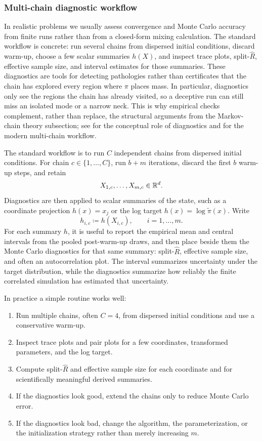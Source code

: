 \subsubsection{Multi-chain diagnostic workflow}
\label{subsec:mcmc-diagnostics}

In realistic problems we usually assess convergence and Monte Carlo accuracy from finite runs rather than from a closed-form mixing calculation.
The standard workflow is concrete: run several chains from dispersed initial conditions, discard warm-up, choose a few scalar summaries \(h(X)\), and inspect trace plots, split-\(\hat R\), effective sample size, and interval estimates for those summaries.
These diagnostics are tools for detecting pathologies rather than certificates that the chain has explored every region where \(\pi\) places mass.
In particular, diagnostics only see the regions the chain has already visited, so a deceptive run can still miss an isolated mode or a narrow neck.
This is why empirical checks complement, rather than replace, the structural arguments from the Markov-chain theory subsection; see \citet[\S2.2--\S2.3]{betancourt_2017_hmc_conceptual} for the conceptual role of diagnostics and \citet[\S1.1]{vehtari_gelman_simpson_carpenter_burkner_2021_rank_normalization} for the modern multi-chain workflow.

The standard workflow is to run $C$ independent chains from dispersed initial conditions.
For chain $c\in\{1,\dots,C\}$, run $b+m$ iterations, discard the first $b$ warm-up steps, and retain
\[
  X_{1,c},\dots,X_{m,c}\in\mathbb{R}^d.
\]
Diagnostics are then applied to scalar summaries of the state, such as a coordinate projection $h(x)=x_j$ or the log target $h(x)=\log \tilde\pi(x)$.
Write
\[
  h_{i,c}\coloneqq h(X_{i,c}),
  \qquad
  i=1,\dots,m.
\]
For each summary $h$, it is useful to report the empirical mean and central intervals from the pooled post-warm-up draws, and then place beside them the Monte Carlo diagnostics for that same summary: split-$\hat R$, effective sample size, and often an autocorrelation plot.
The interval summarizes uncertainty under the target distribution, while the diagnostics summarize how reliably the finite correlated simulation has estimated that uncertainty.

In practice a simple routine works well:
\begin{enumerate}[leftmargin=*,label=(\arabic*)]
  \item Run multiple chains, often $C=4$, from dispersed initial conditions and use a conservative warm-up.
  \item Inspect trace plots and pair plots for a few coordinates, transformed parameters, and the log target.
  \item Compute split-$\hat R$ and effective sample size for each coordinate and for scientifically meaningful derived summaries.
  \item If the diagnostics look good, extend the chains only to reduce Monte Carlo error.
  \item If the diagnostics look bad, change the algorithm, the parameterization, or the initialization strategy rather than merely increasing $m$.
\end{enumerate}

